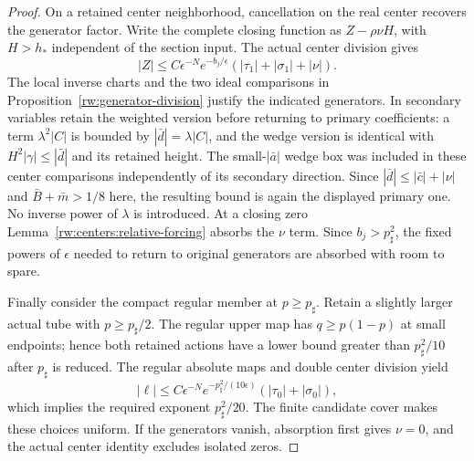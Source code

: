 \begin{proof}
On a retained center neighborhood, cancellation on the real center
recovers the generator factor. Write the complete closing function as
$Z-\rho\nu H$, with $H>h_*$ independent of the section input.
The actual center division gives
\[
 |Z|\le C\epsilon^{-N}e^{-b_j/\epsilon}
             (|\tau_1|+|\sigma_1|+|\nu|).
\]
The local inverse charts and the two ideal comparisons in
Proposition~\ref{rw:generator-division} justify the indicated
generators. In secondary variables retain the weighted version
before returning to primary coefficients: a term
$\lambda^2|C|$ is bounded by
$|\bar d|=\lambda|C|$, and the wedge version is identical
with $H^2|\gamma|\le|\bar d|$ and its retained height.
The small-$|\bar a|$ wedge box was included in these center
comparisons independently of its secondary direction. Since
$|\bar d|\le|\bar c|+|\nu|$ and
$\bar B+\bar m>1/8$ here, the resulting bound is again the
displayed primary one. No inverse power of $\lambda$ is
introduced.
At a closing zero Lemma~\ref{rw:centers:relative-forcing}
absorbs the $\nu$ term. Since $b_j>p_\sharp^2$, the fixed
powers of $\epsilon$ needed to return to original generators
are absorbed with room to spare.

Finally consider the compact regular member at $p\ge p_\sharp$.
Retain a slightly larger actual tube with $p\ge p_\sharp/2$.
The regular upper map has $q\ge p(1-p)$ at small endpoints;
hence both retained actions have a lower bound greater than
$p_\sharp^2/10$ after $p_\sharp$ is reduced. The regular
absolute maps and double center division yield
\[
 |\ell|\le C\epsilon^{-N}e^{-p_\sharp^2/(10\epsilon)}
                      (|\tau_0|+|\sigma_0|),
\]
which implies the required exponent $p_\sharp^2/20$.
The finite candidate cover makes these choices uniform. If the
generators vanish, absorption first gives $\nu=0$, and the actual
center identity excludes isolated zeros.
\end{proof}
